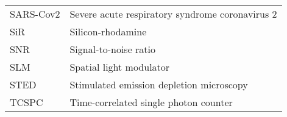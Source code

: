 \begin{tabular}{ll}
	SARS-Cov2 & Severe acute respiratory syndrome coronavirus 2                     \\
	SiR       & Silicon-rhodamine                                                   \\
	SNR       & Signal-to-noise ratio                                               \\
	SLM       & Spatial light modulator                                             \\
	STED      & Stimulated emission depletion  microscopy                           \\
	TCSPC     & Time-correlated single photon counter
\end{tabular}